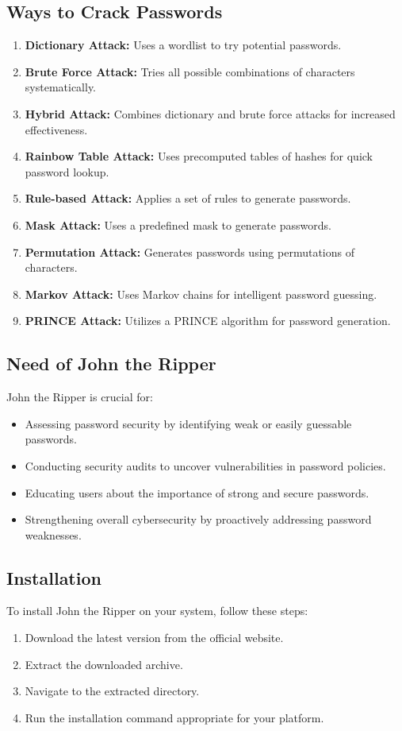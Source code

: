 \documentclass[11pt]{article}
\begin{document}
\subsection{Ways to Crack Passwords}
\begin{enumerate}
    \item \textbf{Dictionary Attack:} Uses a wordlist to try potential passwords.
    \item \textbf{Brute Force Attack:} Tries all possible combinations of characters systematically.
    \item \textbf{Hybrid Attack:} Combines dictionary and brute force attacks for increased effectiveness.
    \item \textbf{Rainbow Table Attack:} Uses precomputed tables of hashes for quick password lookup.
    \item \textbf{Rule-based Attack:} Applies a set of rules to generate passwords.
    \item \textbf{Mask Attack:} Uses a predefined mask to generate passwords.
    \item \textbf{Permutation Attack:} Generates passwords using permutations of characters.
    \item \textbf{Markov Attack:} Uses Markov chains for intelligent password guessing.
    \item \textbf{PRINCE Attack:} Utilizes a PRINCE algorithm for password generation.
\end{enumerate}

\subsection{Need of John the Ripper}
John the Ripper is crucial for:
\begin{itemize}
    \item Assessing password security by identifying weak or easily guessable passwords.
    \item Conducting security audits to uncover vulnerabilities in password policies.
    \item Educating users about the importance of strong and secure passwords.
    \item Strengthening overall cybersecurity by proactively addressing password weaknesses.
\end{itemize}

\subsection{Installation}
To install John the Ripper on your system, follow these steps:
\begin{enumerate}
    \item Download the latest version from the official website.
    \item Extract the downloaded archive.
    \item Navigate to the extracted directory.
    \item Run the installation command appropriate for your platform.
\end{enumerate}
\end{document}
